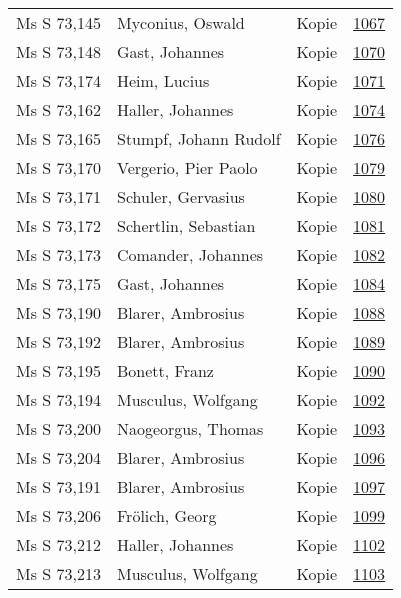 \documentclass[10pt,a4paper,landscape]{report}
\begin{document}
\begin{longtable}{p{16cm}p{4cm}lr}
Ms S 73,145	&	Myconius, Oswald	&	Kopie	&	\href{http://130.60.24.72/assignment/1067}{1067}\\
Ms S 73,148	&	Gast, Johannes	&	Kopie	&	\href{http://130.60.24.72/assignment/1070}{1070}\\
Ms S 73,174	&	Heim, Lucius	&	Kopie	&	\href{http://130.60.24.72/assignment/1071}{1071}\\
Ms S 73,162	&	Haller, Johannes	&	Kopie	&	\href{http://130.60.24.72/assignment/1074}{1074}\\
Ms S 73,165	&	Stumpf, Johann Rudolf	&	Kopie	&	\href{http://130.60.24.72/assignment/1076}{1076}\\
Ms S 73,170	&	Vergerio, Pier Paolo	&	Kopie	&	\href{http://130.60.24.72/assignment/1079}{1079}\\
Ms S 73,171	&	Schuler, Gervasius	&	Kopie	&	\href{http://130.60.24.72/assignment/1080}{1080}\\
Ms S 73,172	&	Schertlin, Sebastian	&	Kopie	&	\href{http://130.60.24.72/assignment/1081}{1081}\\
Ms S 73,173	&	Comander, Johannes	&	Kopie	&	\href{http://130.60.24.72/assignment/1082}{1082}\\
Ms S 73,175	&	Gast, Johannes	&	Kopie	&	\href{http://130.60.24.72/assignment/1084}{1084}\\
Ms S 73,190	&	Blarer, Ambrosius	&	Kopie	&	\href{http://130.60.24.72/assignment/1088}{1088}\\
Ms S 73,192	&	Blarer, Ambrosius	&	Kopie	&	\href{http://130.60.24.72/assignment/1089}{1089}\\
Ms S 73,195	&	Bonett, Franz	&	Kopie	&	\href{http://130.60.24.72/assignment/1090}{1090}\\
Ms S 73,194	&	Musculus, Wolfgang	&	Kopie	&	\href{http://130.60.24.72/assignment/1092}{1092}\\
Ms S 73,200	&	Naogeorgus, Thomas	&	Kopie	&	\href{http://130.60.24.72/assignment/1093}{1093}\\
Ms S 73,204	&	Blarer, Ambrosius	&	Kopie	&	\href{http://130.60.24.72/assignment/1096}{1096}\\
Ms S 73,191	&	Blarer, Ambrosius	&	Kopie	&	\href{http://130.60.24.72/assignment/1097}{1097}\\
Ms S 73,206	&	Frölich, Georg	&	Kopie	&	\href{http://130.60.24.72/assignment/1099}{1099}\\
Ms S 73,212	&	Haller, Johannes	&	Kopie	&	\href{http://130.60.24.72/assignment/1102}{1102}\\
Ms S 73,213	&	Musculus, Wolfgang	&	Kopie	&	\href{http://130.60.24.72/assignment/1103}{1103}\\

\end{longtable}
\end{document}
